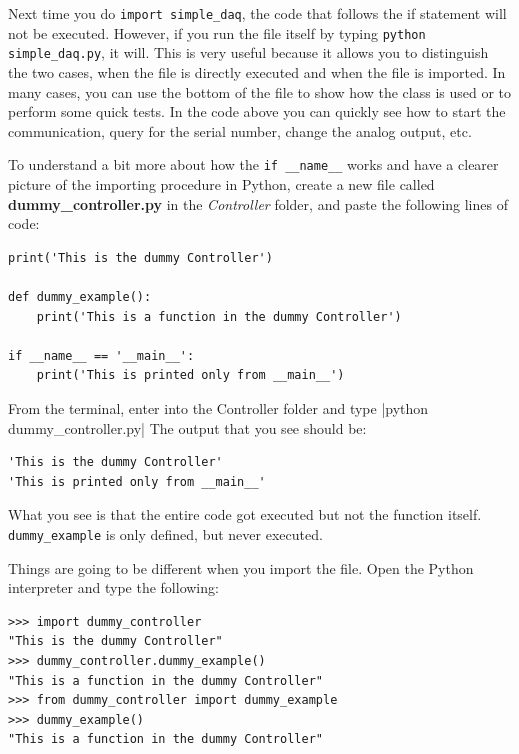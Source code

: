 Next time you do \texttt{import simple_daq}, the code that follows the if statement will not be executed. However, if you run the file itself by typing \texttt{python simple_daq.py}, it will. This is very useful because it allows you to distinguish the two cases, when the file is directly executed and when the file is imported. In many cases, you can use the bottom of the file to show how the class is used or to perform some quick tests. In the code above you can quickly see how to start the communication, query for the serial number, change the analog output, etc.

To understand a bit more about how the \texttt{if __name__} works and have a clearer picture of the importing procedure in Python, create
a new file called \textbf{dummy\_controller.py} in the \emph{Controller} folder, and paste the following lines of code:

\begin{verbatim}
print('This is the dummy Controller')

def dummy_example():
    print('This is a function in the dummy Controller')

if __name__ == '__main__':
    print('This is printed only from __main__')
\end{verbatim}

From the terminal, enter into the Controller folder and type |python dummy_controller.py| The output that you see should be:

\begin{verbatim}
'This is the dummy Controller'
'This is printed only from __main__'
\end{verbatim}

What you see is that the entire code got executed but not the function itself. \texttt{dummy_example} is only defined, but never executed.


Things are going to be different when you import the file. Open the Python interpreter and type the following:

\begin{verbatim}
>>> import dummy_controller
"This is the dummy Controller"
>>> dummy_controller.dummy_example()
"This is a function in the dummy Controller"
>>> from dummy_controller import dummy_example
>>> dummy_example()
"This is a function in the dummy Controller"
\end{verbatim}

